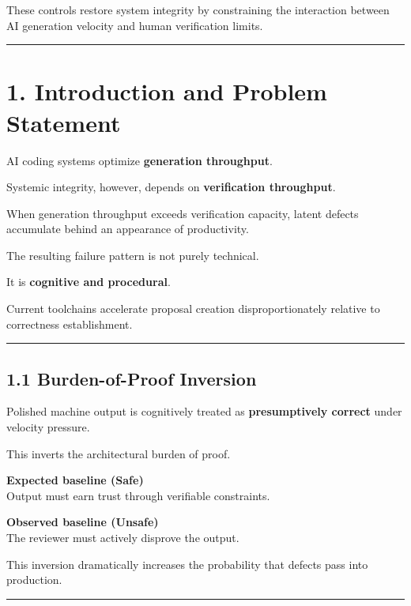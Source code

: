\documentclass[
]{article}
\begin{document}
These controls restore system integrity by constraining the interaction
between AI generation velocity and human verification limits.

\begin{center}\rule{0.5\linewidth}{0.5pt}\end{center}

\section{1. Introduction and Problem
Statement}\label{1-introduction-and-problem-statement}

AI coding systems optimize \textbf{generation throughput}.

Systemic integrity, however, depends on \textbf{verification
throughput}.

When generation throughput exceeds verification capacity, latent defects
accumulate behind an appearance of productivity.

The resulting failure pattern is not purely technical.

It is \textbf{cognitive and procedural}.

Current toolchains accelerate proposal creation disproportionately
relative to correctness establishment.

\begin{center}\rule{0.5\linewidth}{0.5pt}\end{center}

\subsection{1.1 Burden-of-Proof
Inversion}\label{11-burden-of-proof-inversion}

Polished machine output is cognitively treated as \textbf{presumptively
correct} under velocity pressure.

This inverts the architectural burden of proof.

\textbf{Expected baseline (Safe)}\\
Output must earn trust through verifiable constraints.

\textbf{Observed baseline (Unsafe)}\\
The reviewer must actively disprove the output.

This inversion dramatically increases the probability that defects pass
into production.

\begin{center}\rule{0.5\linewidth}{0.5pt}\end{center}
\end{document}
